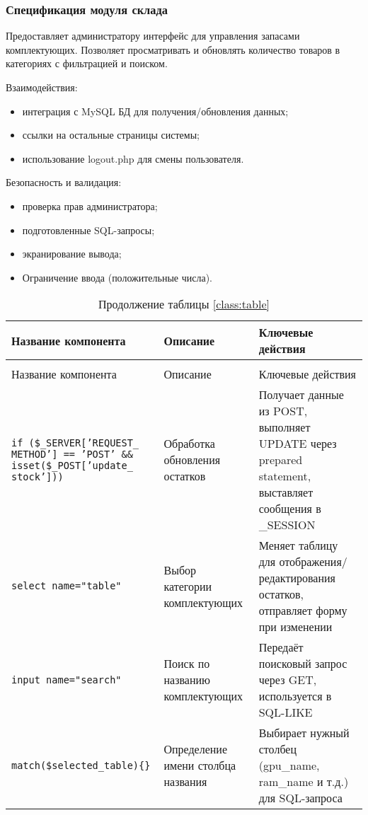 \subsubsection{Спецификация модуля склада}
Предоставляет администратору интерфейс для управления запасами комплектующих. Позволяет просматривать и обновлять количество товаров в категориях с фильтрацией и поиском.

Взаимодействия:
\begin{itemize}
	\item интеграция с MySQL БД для получения/обновления данных;
	\item ссылки на остальные страницы системы;
	\item использование logout.php для смены пользователя.
\end{itemize}

Безопасность и валидация:
\begin{itemize}
	\item проверка прав администратора;
	\item подготовленные SQL-запросы;
	\item экранирование вывода;
	\item Ограничение ввода (положительные числа).
\end{itemize}

\newpage

\renewcommand{\arraystretch}{0.8}
\begin{xltabular}{\textwidth}{|p{5cm}|p{5.5cm}|p{5.5cm}|}
	\caption{Ключевые компоненты и функции склада}\\
	\hline \centrow Название компонента & \centrow Описание & \centrow Ключевые действия \\
	\hline \endfirsthead
	\caption*{Продолжение таблицы \ref{class:table}}\\
	\hline \centrow Название компонента & \centrow Описание & \centrow Ключевые действия \\
	\hline \endhead
	
	\texttt{if (\$\_SERVER['REQUEST\_ METHOD'] == 'POST' \&\& isset(\$\_POST['update\_ stock']))} & Обработка обновления остатков & Получает данные из POST, выполняет UPDATE через prepared statement, выставляет сообщения в \_SESSION \\ \hline
	
	\texttt{select name="table"} & Выбор категории комплектующих & Меняет таблицу для отображения/редактирования остатков, отправляет форму при изменении \\ \hline
	
	\texttt{input name="search"} & Поиск по названию комплектующих & Передаёт поисковый запрос через GET, используется в SQL-LIKE \\ \hline
	
	\texttt{match(\$selected\_table)\{\}} & Определение имени столбца названия & Выбирает нужный столбец (gpu\_name, ram\_name и т.д.) для SQL-запроса \\ \hline
\end{xltabular}
\renewcommand{\arraystretch}{1.0}

